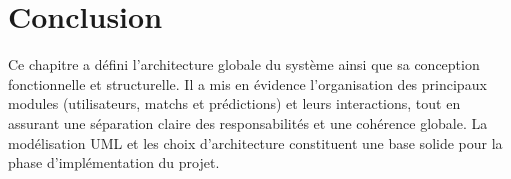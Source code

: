 \section*{Conclusion }

Ce chapitre a défini l’architecture globale du système ainsi que sa conception fonctionnelle et structurelle. Il a mis en évidence l’organisation des principaux modules (utilisateurs, matchs et prédictions) et leurs interactions, tout en assurant une séparation claire des responsabilités et une cohérence globale. La modélisation UML et les choix d’architecture constituent une base solide pour la phase d’implémentation du projet.
